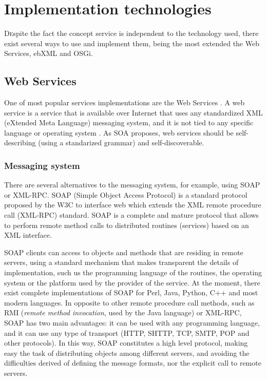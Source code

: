 \section{Implementation technologies}

\lettrine{D}espite the fact the concept service is independent to the technology used, there exist several ways to use and implement them, being the most extended the Web Services, ebXML and OSGi.

\subsection{Web Services}

One of most popular services implementations are the Web Services \cite{Papazoglou2007SOA}. A web service is a service that is available over Internet that uses any standardized XML (eXtended Meta Language) \cite{XML} messaging system, and it is not tied to any specific language or operating system \cite{Cerami2002Webservices}.  As SOA proposes, web services should be self-describing (using a standarized grammar) and self-discoverable.

\subsubsection{Messaging system} There are several alternatives to the messaging system, for example, using SOAP or XML-RPC. SOAP (Simple Object Access Protocol) is a standard protocol proposed by the W3C \cite{SOAP} to interface web  which  extends the XML remote procedure call (XML-RPC) standard. 
SOAP is a complete and mature protocol that allows to perform remote method calls to distributed routines (services) based on an XML interface.

SOAP clients can access to objects and methods that are residing in remote servers, using a standard mechanism that makes transparent the details of implementation, such us the programming language of the
routines, the operating system or the platform used by the provider of the service. 
At the moment, there exist complete implementations of SOAP for Perl, Java, Python, C++ and most modern languages.
In opposite to other remote procedure call methods, such as RMI (\emph{remote method invocation}, used by the Java language) or XML-RPC, SOAP has two main advantages: it can be used with any programming language, and it can use any type of transport (HTTP, SHTTP, TCP, SMTP, POP and other protocols). In this way, SOAP constitutes a high level protocol, making easy the task of distributing objects among different servers, and avoiding the difficulties derived of defining the message formats, nor the explicit call to remote servers.


